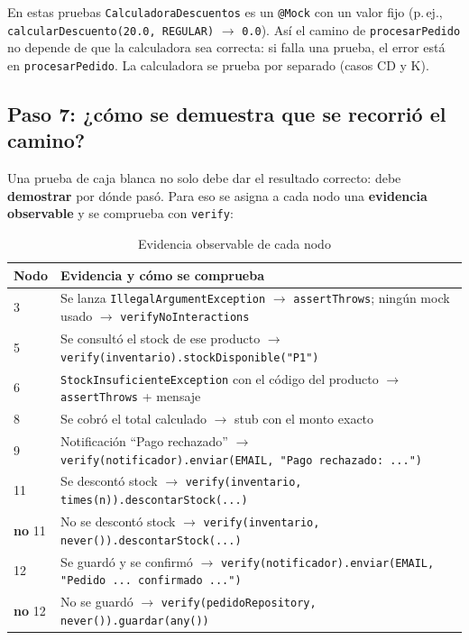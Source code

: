 \documentclass[11pt,a4paper,oneside]{report}
\newcommand{\code}[1]{\texttt{#1}}
\begin{document}
\begin{idea}
En estas pruebas \code{CalculadoraDescuentos} es un \code{@Mock} con un valor fijo (p.\,ej., \code{calcularDescuento(20.0, REGULAR)} $\rightarrow$ \code{0.0}). Así el camino de \code{procesarPedido} no depende de que la calculadora sea correcta: si falla una prueba, el error está en \code{procesarPedido}. La calculadora se prueba por separado (casos CD y K).
\end{idea}

\subsection{Paso 7: ¿cómo se demuestra que se recorrió el camino?}
Una prueba de caja blanca no solo debe dar el resultado correcto: debe \textbf{demostrar} por dónde pasó. Para eso se asigna a cada nodo una \textbf{evidencia observable} y se comprueba con \code{verify}:

\begin{table}[H]
\centering
\caption{Evidencia observable de cada nodo}
\small
\begin{tabularx}{\linewidth}{lX}
\toprule
\textbf{Nodo} & \textbf{Evidencia y cómo se comprueba}\\
\midrule
3 & Se lanza \code{IllegalArgumentException} $\rightarrow$ \code{assertThrows}; ningún mock usado $\rightarrow$ \code{verifyNoInteractions}\\
5 & Se consultó el stock de ese producto $\rightarrow$ \code{verify(inventario).stockDisponible("P1")}\\
6 & \code{StockInsuficienteException} con el código del producto $\rightarrow$ \code{assertThrows} + mensaje\\
8 & Se cobró el total calculado $\rightarrow$ stub con el monto exacto\\
9 & Notificación ``Pago rechazado'' $\rightarrow$ \code{verify(notificador).enviar(EMAIL, "Pago rechazado: ...")}\\
11 & Se descontó stock $\rightarrow$ \code{verify(inventario, times(n)).descontarStock(...)}\\
\textbf{no} 11 & No se descontó stock $\rightarrow$ \code{verify(inventario, never()).descontarStock(...)}\\
12 & Se guardó y se confirmó $\rightarrow$ \code{verify(notificador).enviar(EMAIL, "Pedido ... confirmado ...")}\\
\textbf{no} 12 & No se guardó $\rightarrow$ \code{verify(pedidoRepository, never()).guardar(any())}\\
\bottomrule
\end{tabularx}
\end{table}
\end{document}
